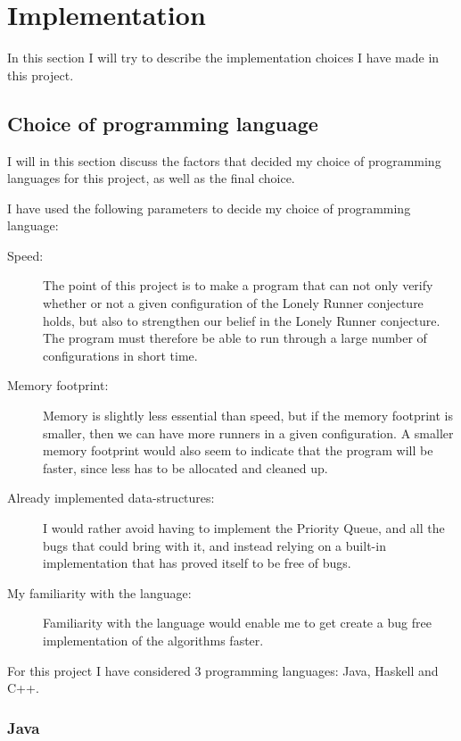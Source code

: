 \section{Implementation}
\label{implementation}

In this section I will try to describe the implementation choices I have made in this project.


\subsection{Choice of programming language}
I will in this section discuss the factors that decided my choice of programming languages for this project, as well as the final choice.

I have used the following parameters to decide my choice of programming language:
\begin{description}
\item[Speed:] The point of this project is to make a program that can not only verify whether or not a given configuration of the Lonely Runner conjecture holds, but also to strengthen our belief in the Lonely Runner conjecture. The program must therefore be able to run through a large number of configurations in short time.
\item[Memory footprint:] Memory is slightly less essential than speed, but if the memory footprint is smaller, then we can have more runners in a given configuration. A smaller memory footprint would also seem to indicate that the program will be faster, since less has to be allocated and cleaned up. 
\item[Already implemented data-structures:] I would rather avoid having to implement the Priority Queue, and all the bugs that could bring with it, and instead relying on a built-in implementation that has proved itself to be free of bugs.
\item[My familiarity with the language:] Familiarity with the language would enable me to get create a bug free implementation of the algorithms faster.
\end{description}



For this project I have considered 3 programming languages: Java, Haskell and C++.

\subsubsection{Java}

